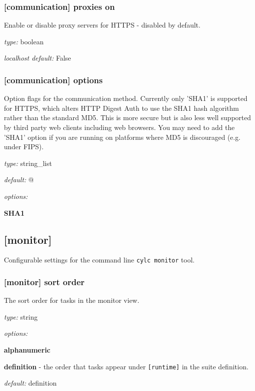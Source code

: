 \subsubsection[proxies on]{[communication] \textrightarrow proxies on}

Enable or disable proxy servers for HTTPS - disabled by default.

\begin{myitemize}
\item {\em type:} boolean
\item {\em localhost default:} False
\end{myitemize}

\subsubsection[options]{[communication] \textrightarrow options}

Option flags for the communication method. Currently only 'SHA1' is
supported for HTTPS, which alters HTTP Digest Auth to use the SHA1 hash
algorithm rather than the standard MD5. This is more secure but is also
less well supported by third party web clients including web browsers.
You may need to add the 'SHA1' option if you are running on platforms
where MD5 is discouraged (e.g. under FIPS).

\begin{myitemize}
\item {\em type:} string\_list
\item {\em default:} \lstinline@[]@
\item {\em options:}
    \begin{myitemize}
        \item {\bf SHA1}
    \end{myitemize}
\end{myitemize}

\subsection{[monitor]}

Configurable settings for the command line \lstinline=cylc monitor= tool.

\subsubsection[monitor]{[monitor] \textrightarrow sort order}

The sort order for tasks in the monitor view.
\begin{myitemize}
    \item {\em type:} string
    \item {\em options:}
    \begin{myitemize}
        \item {\bf alphanumeric}
        \item {\bf definition} -  the order that tasks appear under
            \lstinline=[runtime]= in the suite definition.
    \end{myitemize}
    \item {\em default:} definition
\end{myitemize}

